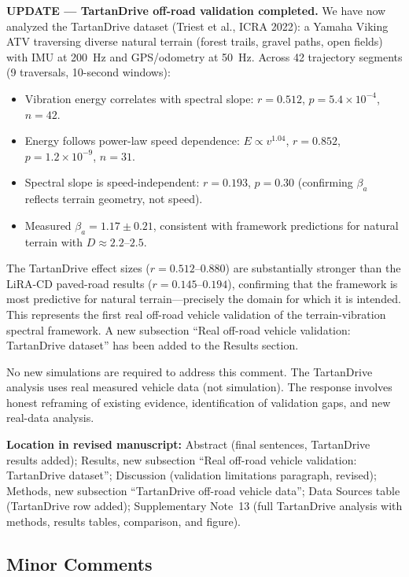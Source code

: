 \documentclass[11pt]{article}
\newcommand{\revloc}[1]{\noindent\textbf{Location in revised manuscript:} #1\medskip}
\begin{document}
\textbf{UPDATE --- TartanDrive off-road validation completed.} We have now analyzed the TartanDrive dataset (Triest et al., ICRA 2022): a Yamaha Viking ATV traversing diverse natural terrain (forest trails, gravel paths, open fields) with IMU at 200~Hz and GPS/odometry at 50~Hz. Across 42 trajectory segments (9 traversals, 10-second windows):

\begin{itemize}[leftmargin=*]
\item Vibration energy correlates with spectral slope: $r = 0.512$, $p = 5.4 \times 10^{-4}$, $n = 42$.
\item Energy follows power-law speed dependence: $E \propto v^{1.04}$, $r = 0.852$, $p = 1.2 \times 10^{-9}$, $n = 31$.
\item Spectral slope is speed-independent: $r = 0.193$, $p = 0.30$ (confirming $\beta_a$ reflects terrain geometry, not speed).
\item Measured $\beta_a = 1.17 \pm 0.21$, consistent with framework predictions for natural terrain with $D \approx 2.2$--$2.5$.
\end{itemize}

\noindent The TartanDrive effect sizes ($r = 0.512$--$0.880$) are substantially stronger than the LiRA-CD paved-road results ($r = 0.145$--$0.194$), confirming that the framework is most predictive for natural terrain---precisely the domain for which it is intended. This represents the first real off-road vehicle validation of the terrain-vibration spectral framework. A new subsection ``Real off-road vehicle validation: TartanDrive dataset'' has been added to the Results section.

No new simulations are required to address this comment. The TartanDrive analysis uses real measured vehicle data (not simulation). The response involves honest reframing of existing evidence, identification of validation gaps, and new real-data analysis.

\revloc{Abstract (final sentences, TartanDrive results added); Results, new subsection ``Real off-road vehicle validation: TartanDrive dataset''; Discussion (validation limitations paragraph, revised); Methods, new subsection ``TartanDrive off-road vehicle data''; Data Sources table (TartanDrive row added); Supplementary Note~13 (full TartanDrive analysis with methods, results tables, comparison, and figure).}

\bigskip

\subsection*{Minor Comments}
\end{document}
